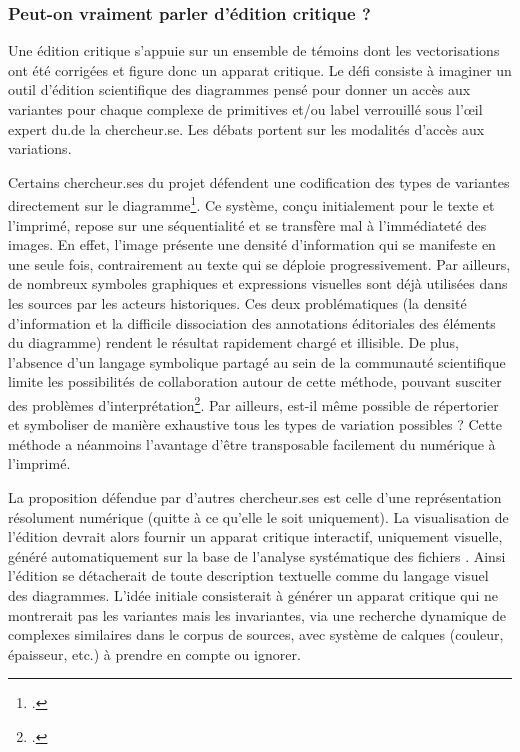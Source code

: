 \hypertarget{peut-on-vraiment-parler-dedition-critique}{%
\subsubsection{Peut-on vraiment parler d'édition critique
?}\label{peut-on-vraiment-parler-dedition-critique}}

Une édition critique s'appuie sur un ensemble de témoins dont les
vectorisations ont été corrigées et figure donc un apparat critique. Le
défi consiste à imaginer un outil d'édition scientifique des diagrammes
pensé pour donner un accès aux variantes pour chaque complexe de
primitives et/ou label verrouillé sous l'œil expert du.de la chercheur.se. Les
débats portent sur les modalités d'accès aux variations.

Certains chercheur.ses du projet défendent une codification des types de
variantes directement sur le diagramme\footcite[``Electronic tools such
  as DRaFT allow us to indicate editorial actions by altering the weight
  of solid lines or by using various forms of dashed lines.''][p.229]{de_young_editing_2014}. Ce
système, conçu initialement pour le texte et l'imprimé, repose sur une
séquentialité et se transfère mal à l'immédiateté des images. En effet,
l'image présente une densité d'information qui se manifeste en une seule
fois, contrairement au texte qui se déploie progressivement. Par
ailleurs, de nombreux symboles graphiques et expressions visuelles sont
déjà utilisées dans les sources par les acteurs historiques. Ces deux
problématiques (la densité d'information et la difficile dissociation des
annotations éditoriales des éléments du diagramme) rendent le résultat
rapidement chargé et illisible. De plus, l'absence d'un langage
symbolique partagé au sein de la communauté scientifique limite les
possibilités de collaboration autour de cette méthode, pouvant susciter
des problèmes d'interprétation\footcite[``Since there is as yet no
  strong consensus on how to indicate various forms of editor
  interference within diagrams, there is the potential for confusing or
  contradictory indicators to develop.''][p.229]{de_young_editing_2014}. Par
ailleurs, est-il même possible de répertorier et symboliser de manière
exhaustive tous les types de variation possibles ? Cette méthode a
néanmoins l'avantage d'être transposable facilement du numérique à
l'imprimé.

La proposition défendue par d'autres chercheur.ses est celle d'une
représentation résolument numérique (quitte à ce qu'elle le soit
uniquement). La visualisation de l'édition devrait alors fournir un
apparat critique interactif, uniquement visuelle, généré automatiquement
sur la base de l'analyse systématique des fichiers \svg. Ainsi l'édition
se détacherait de toute description textuelle comme du langage visuel
des diagrammes. L'idée initiale consisterait à générer un apparat critique
qui ne montrerait pas les variantes mais les invariantes, via une
recherche dynamique de complexes similaires dans le corpus de sources,
avec système de calques (couleur, épaisseur, etc.) à prendre en compte
ou ignorer.

